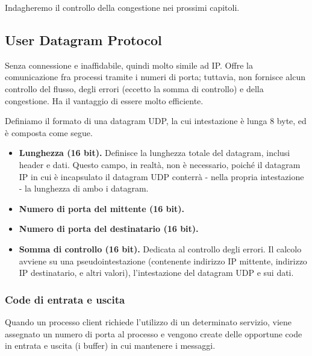            Indagheremo il controllo della congestione nei prossimi capitoli.
            
    \subsection{User Datagram Protocol}
    
        Senza connessione e inaffidabile, quindi molto simile ad IP. Offre la comunicazione fra processi tramite i numeri di porta; tuttavia, non fornisce alcun controllo del flusso, degli errori (eccetto la somma di controllo) e della congestione. Ha il vantaggio di essere molto efficiente.
        
        Definiamo il formato di una datagram UDP, la cui intestazione è lunga 8 byte, ed è composta come segue.
        
        \begin{itemize}
            \item
                \textbf{Lunghezza (16 bit).} Definisce la lunghezza totale del datagram, inclusi header e dati. Questo campo, in realtà, non è necessario, poiché il datagram IP in cui è incapsulato il datagram UDP conterrà - nella propria intestazione - la lunghezza di ambo i datagram.
                
            \item
                \textbf{Numero di porta del mittente (16 bit).}
                
            \item
               \textbf{Numero di porta del destinatario (16 bit).}
                
            \item
                \textbf{Somma di controllo (16 bit).} Dedicata al controllo degli errori. Il calcolo avviene su una pseudointestazione (contenente indirizzo IP mittente, indirizzo IP destinatario, e altri valori), l'intestazione del datagram UDP e sui dati.
        \end{itemize}
        
        \subsubsection{Code di entrata e uscita}
        
            Quando un processo client richiede l'utilizzo di un determinato servizio, viene assegnato un numero di porta al processo e vengono create delle opportune code in entrata e uscita (i buffer) in cui mantenere i messaggi.
            
